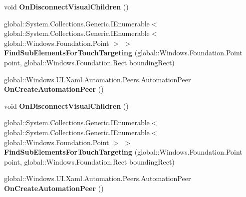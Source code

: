 \begin{DoxyCompactItemize}
void {\bfseries On\+Disconnect\+Visual\+Children} ()
\item 
\mbox{\label{interface_windows_1_1_u_i_1_1_xaml_1_1_i_u_i_element_overrides_a5714beae53dfcb7b4ec4a10f33a9677c}} 
global\+::\+System.\+Collections.\+Generic.\+I\+Enumerable$<$ global\+::\+System.\+Collections.\+Generic.\+I\+Enumerable$<$ global\+::\+Windows.\+Foundation.\+Point $>$ $>$ {\bfseries Find\+Sub\+Elements\+For\+Touch\+Targeting} (global\+::\+Windows.\+Foundation.\+Point point, global\+::\+Windows.\+Foundation.\+Rect bounding\+Rect)
\item 
\mbox{\label{interface_windows_1_1_u_i_1_1_xaml_1_1_i_u_i_element_overrides_ab9b9f7e630841a2f31a5fcc322e5d783}} 
global\+::\+Windows.\+U\+I.\+Xaml.\+Automation.\+Peers.\+Automation\+Peer {\bfseries On\+Create\+Automation\+Peer} ()
\item 
\mbox{\label{interface_windows_1_1_u_i_1_1_xaml_1_1_i_u_i_element_overrides_aa24ecfd911511d1d3d8e9156c62ed212}} 
void {\bfseries On\+Disconnect\+Visual\+Children} ()
\item 
\mbox{\label{interface_windows_1_1_u_i_1_1_xaml_1_1_i_u_i_element_overrides_a5714beae53dfcb7b4ec4a10f33a9677c}} 
global\+::\+System.\+Collections.\+Generic.\+I\+Enumerable$<$ global\+::\+System.\+Collections.\+Generic.\+I\+Enumerable$<$ global\+::\+Windows.\+Foundation.\+Point $>$ $>$ {\bfseries Find\+Sub\+Elements\+For\+Touch\+Targeting} (global\+::\+Windows.\+Foundation.\+Point point, global\+::\+Windows.\+Foundation.\+Rect bounding\+Rect)
\item 
\mbox{\label{interface_windows_1_1_u_i_1_1_xaml_1_1_i_u_i_element_overrides_ab9b9f7e630841a2f31a5fcc322e5d783}} 
global\+::\+Windows.\+U\+I.\+Xaml.\+Automation.\+Peers.\+Automation\+Peer {\bfseries On\+Create\+Automation\+Peer} ()
\item 
\mbox{\label{interface_windows_1_1_u_i_1_1_xaml_1_1_i_u_i_element_overrides_aa24ecfd911511d1d3d8e9156c62ed212}} 

\end{DoxyCompactItemize}
